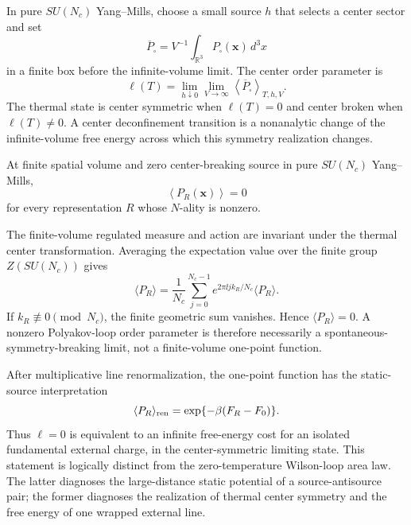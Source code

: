 \begin{definition}
\label{def:qcd-center-order-deconfinement}
In pure \(SU(N_c)\) Yang--Mills, choose a small source \(h\) that selects a
center sector and set
\[
  \overline P_\square
  =
  V^{-1}\int_{\mathbb R^3}P_\square(\mathbf x)\,d^3x
\]
in a finite box before the infinite-volume limit.  The center order
parameter is
\begin{equation}
  \ell(T)
  =
  \lim_{h\downarrow0}\lim_{V\to\infty}
  \left\langle \overline P_\square\right\rangle_{T,h,V}.
  \label{eq:qcd-phase-polyakov-order}
\end{equation}
The thermal state is center symmetric when \(\ell(T)=0\) and center broken
when \(\ell(T)\ne0\).  A center deconfinement transition is a nonanalytic
change of the infinite-volume free energy across which this symmetry
realization changes.
\end{definition}

\begin{remark}
\label{rem:qcd-center-finite-volume-loop-zero}
At finite spatial volume and zero center-breaking source in pure
\(SU(N_c)\) Yang--Mills,
\[
  \left\langle P_R(\mathbf x)\right\rangle=0
\]
for every representation \(R\) whose \(N\)-ality is nonzero.

The finite-volume regulated measure and action are invariant under the
thermal center transformation.  Averaging the expectation value over the
finite group \(Z(SU(N_c))\) gives
\[
  \langle P_R\rangle
  =
  \frac1{N_c}\sum_{j=0}^{N_c-1}
  e^{2\pi\ii j k_R/N_c}\langle P_R\rangle .
\]
If \(k_R\not\equiv0\pmod{N_c}\), the finite geometric sum vanishes.  Hence
\(\langle P_R\rangle=0\).  A nonzero Polyakov-loop order parameter is
therefore necessarily a spontaneous-symmetry-breaking limit, not a
finite-volume one-point function.
\end{remark}

After multiplicative line renormalization, the one-point function has the
static-source interpretation
\begin{equation}
  \langle P_R\rangle_{\rm ren}
  =
  \exp\{-\beta(F_R-F_0)\}.
  \label{eq:qcd-phase-static-source-free-energy}
\end{equation}
Thus \(\ell=0\) is equivalent to an infinite free-energy cost for an isolated
fundamental external charge, in the center-symmetric limiting state.  This
statement is logically distinct from the zero-temperature Wilson-loop area
law.  The latter diagnoses the large-distance static potential of a
source-antisource pair; the former diagnoses the realization of thermal
center symmetry and the free energy of one wrapped external line.

